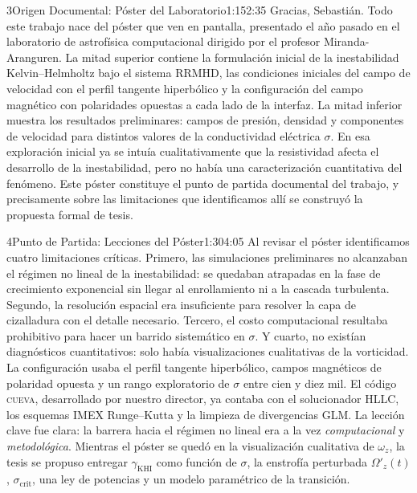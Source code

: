 \documentclass[11pt,a4paper]{article}
\begin{document}
\begin{bryorador}{3}{Origen Documental: Póster del Laboratorio}{1:15}{2:35}
Gracias, Sebastián. Todo este trabajo nace del póster que ven en pantalla,
presentado el año pasado en el laboratorio de astrofísica computacional
dirigido por el profesor Miranda-Aranguren. La mitad superior contiene la
formulación inicial de la inestabilidad Kelvin--Helmholtz bajo el sistema
RRMHD, las condiciones iniciales del campo de velocidad con el perfil
tangente hiperbólico y la configuración del campo magnético con polaridades
opuestas a cada lado de la interfaz. La mitad inferior muestra los resultados
preliminares: campos de presión, densidad y componentes de velocidad para
distintos valores de la conductividad eléctrica $\sigma$. En esa exploración
inicial ya se intuía cualitativamente que la resistividad afecta el desarrollo
de la inestabilidad, pero no había una caracterización cuantitativa del
fenómeno. Este póster constituye el punto de partida documental del trabajo,
y precisamente sobre las limitaciones que identificamos allí se construyó la
propuesta formal de tesis.
\end{bryorador}

\begin{bryorador}{4}{Punto de Partida: Lecciones del Póster}{1:30}{4:05}
Al revisar el póster identificamos cuatro limitaciones críticas. Primero, las
simulaciones preliminares no alcanzaban el régimen no lineal de la
inestabilidad: se quedaban atrapadas en la fase de crecimiento exponencial sin
llegar al enrollamiento ni a la cascada turbulenta. Segundo, la resolución
espacial era insuficiente para resolver la capa de cizalladura con el detalle
necesario. Tercero, el costo computacional resultaba prohibitivo para hacer
un barrido sistemático en $\sigma$. Y cuarto, no existían diagnósticos
cuantitativos: solo había visualizaciones cualitativas de la vorticidad. La
configuración usaba el perfil tangente hiperbólico, campos magnéticos de
polaridad opuesta y un rango exploratorio de $\sigma$ entre cien y diez mil.
El código \textsc{cueva}, desarrollado por nuestro director, ya contaba con
el solucionador HLLC, los esquemas IMEX Runge--Kutta y la limpieza de
divergencias GLM. La lección clave fue clara: la barrera hacia el régimen no
lineal era a la vez \emph{computacional} y \emph{metodológica}. Mientras el
póster se quedó en la visualización cualitativa de $\omega_z$, la tesis se
propuso entregar $\gamma_\text{KHI}$ como función de $\sigma$, la enstrofía
perturbada $\Omega'_z(t)$, $\sigma_\text{crit}$, una ley de potencias y un
modelo paramétrico de la transición.
\end{bryorador}
\end{document}
